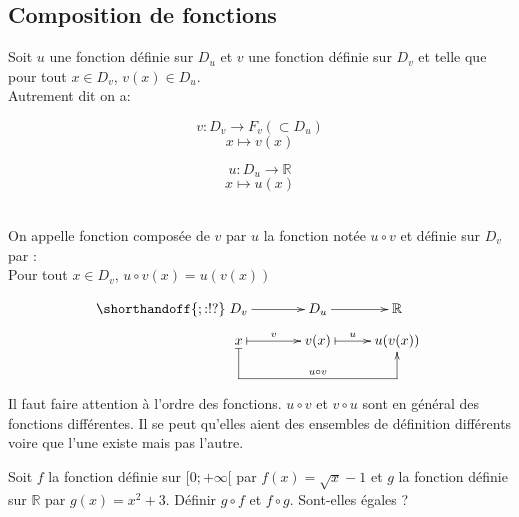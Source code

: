 \documentclass[french]{book}
\newcommand{\R}{\mathbb {R}}
\begin{document}
\subsection{Composition de fonctions}
\begin{defn}
Soit $u$ une fonction définie sur $D_{u}$ et $v$ une fonction définie sur $D_{v}$ et telle que pour tout $x\in D_{v}$, $v(x)\in D_{u}$.\\

Autrement dit on a:

\begin{minipage}[c]{0.5\linewidth}
\begin{center}
$$v : D_v \longrightarrow F_v (\subset D_u) $$
$$ x \mapsto v(x)$$
\end{center}
\end{minipage}
\hfill
\begin{minipage}[c]{0.5\linewidth}
\begin{center}
$$u : D_u \longrightarrow \mathbb{R} $$
$$ x \mapsto u(x)$$
\end{center}
\end{minipage}\\


On appelle fonction composée de $v$ par $u$ la fonction notée $u\circ v$ et définie sur $D_{v}$ par :\\

\hspace*{4.5cm}Pour tout $x\in D_{v}$, $u\circ v(x)=u(v(x))$



\[\shorthandoff{;:!?} \xymatrix @!0 @R=0.8cm @C=2cm{
D_v \ar@{->}[r] & D_u \ar@{->}[r] & \R \\
x \ar@{|->}[r]^-v \ar@{|->}'[d]+D '[rrd]+D^-{u\circ v} [rr]& v(x) \ar@{|->}[r]^-u & u(v(x)) \\
& &
 }\]
\end{defn}
\vspace{1ex}

\begin{rem} Il faut faire attention à l'ordre des fonctions. $u\circ v$ et $v \circ u$ sont en général des fonctions différentes.
Il se peut qu'elles aient des ensembles de définition différents voire que l'une existe mais pas l'autre.
\end{rem}

\begin{exemple}
Soit $f$ la fonction définie sur $[0;+\infty[$ par $f(x)=\sqrt{x}-1$ et $g$ la fonction définie sur $\R$ par $g(x)=x^{2}+3$. Définir $g \circ f$ et $f \circ g$. Sont-elles égales ?
\end{exemple}
\end{document}
